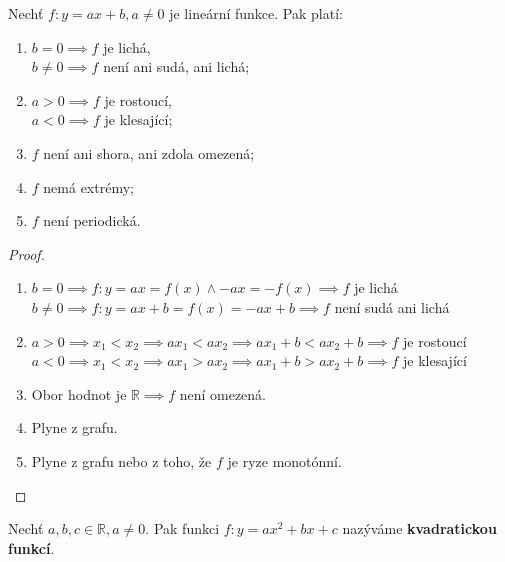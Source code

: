 \begin{veta}
  Nechť $f: y = ax + b, a \neq 0$ je lineární funkce. Pak platí:
  \begin{enumerate}[$i.$]
    \item $b=0 \implies f$ je lichá,\\
          $b \neq 0 \implies f$ není ani sudá, ani lichá;
    \item $a > 0 \implies f$ je rostoucí,\\
          $a < 0 \implies f$ je klesající;
    \item $f$ není ani shora, ani zdola omezená;
    \item $f$ nemá extrémy;
    \item $f$ není periodická.
  \end{enumerate}
\end{veta}

\begin{proof}\,
  \begin{enumerate}[$i.$]
    \item $b=0 \implies f:y= ax = f(x) \land -ax = -f(x) \implies f$ je lichá\\
          $b\neq 0 \implies f:y = ax + b = f(x) = -ax + b \implies f$ není sudá ani lichá
    \item $a>0 \implies x_1 < x_2 \implies ax_1 < ax_2 \implies ax_1 + b < ax_2 + b \implies f$ je rostoucí\\
          $a<0 \implies x_1 < x_2 \implies ax_1 > ax_2 \implies ax_1 + b > ax_2 + b \implies f$ je klesající
    \item Obor hodnot je $\mathbb R \implies f$ není omezená.
    \item Plyne z grafu.
    \item Plyne z grafu nebo z toho, že $f$ je ryze monotónní. \qedhere
  \end{enumerate}
\end{proof}

\begin{definition}
  Nechť $a,b,c \in \mathbb R, a \neq 0$. Pak funkci $f:y = ax^2 + bx+ c$ nazýváme \textbf{kvadratickou funkcí}.
\end{definition}

